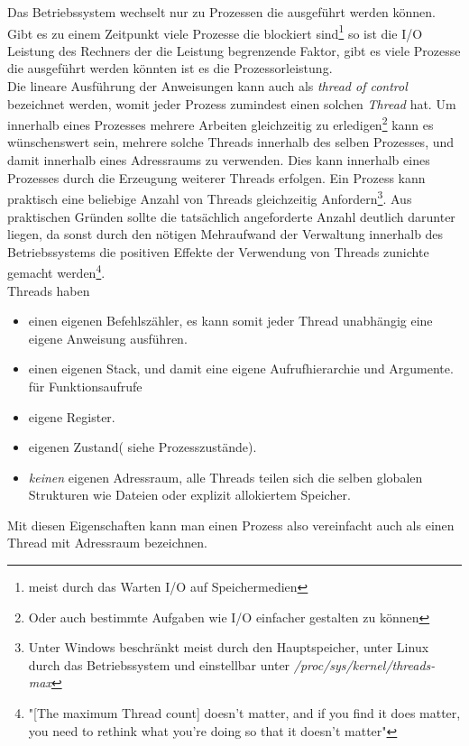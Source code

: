 Das Betriebssystem wechselt nur zu Prozessen die ausgeführt werden können. Gibt es zu einem Zeitpunkt viele Prozesse die blockiert sind\footnote{meist durch das Warten I/O auf Speichermedien} so ist die I/O Leistung des Rechners der die Leistung begrenzende Faktor, gibt es viele Prozesse die ausgeführt werden könnten ist es die Prozessorleistung.
\\Die lineare Ausführung der Anweisungen kann auch als \emph{thread of control} bezeichnet werden, womit jeder Prozess zumindest einen solchen \emph{Thread} hat. Um innerhalb eines Prozesses mehrere Arbeiten gleichzeitig zu erledigen\footnote{Oder auch bestimmte Aufgaben wie I/O einfacher gestalten zu können} kann es wünschenswert sein, mehrere solche Threads innerhalb des selben Prozesses, und damit innerhalb eines Adressraums zu verwenden. Dies kann innerhalb eines Prozesses durch die Erzeugung weiterer Threads erfolgen. Ein Prozess kann praktisch eine beliebige Anzahl von Threads gleichzeitig Anfordern\footnote{Unter Windows beschränkt meist durch den Hauptspeicher, unter Linux durch das Betriebssystem und einstellbar unter \textit{/proc/sys/kernel/threads-max}}. Aus praktischen Gründen sollte die tatsächlich angeforderte Anzahl deutlich darunter liegen, da sonst durch den nötigen Mehraufwand der Verwaltung innerhalb des Betriebssystems die positiven Effekte der Verwendung von Threads zunichte gemacht werden\footnote{"[The maximum Thread count] doesn't matter, and if you find it does matter, you need to rethink what you're doing so that it doesn't matter"\parencite{stacko_threadcount}}.
\\Threads haben \parencite[S. 148]{tanenbaum2016}
\begin{itemize}
	\item einen eigenen Befehlszähler, es kann somit jeder Thread unabhängig eine eigene Anweisung ausführen.
	\item einen eigenen Stack, und damit eine eigene Aufrufhierarchie und Argumente. für Funktionsaufrufe
	\item eigene Register.
	\item eigenen Zustand( siehe Prozesszustände).
	\item \emph{keinen} eigenen Adressraum, alle Threads teilen sich die selben globalen Strukturen wie Dateien oder explizit allokiertem Speicher.
\end{itemize}	
Mit diesen Eigenschaften kann man einen Prozess also vereinfacht auch als einen Thread mit Adressraum bezeichnen.\parencite[S. 1]{butenhof1997}

